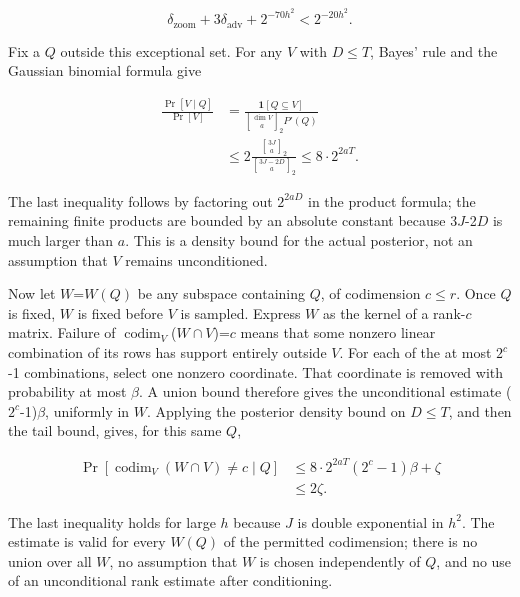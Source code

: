 \begin{equation}\label{eq:10}
\delta_{\mathrm{zoom}}+3\delta_{\mathrm{adv}}+2^{-70h^2}<2^{-20h^2}.
\end{equation}

Fix a \(Q\) outside this exceptional set. For any \(V\) with \(D\)\(\le\)\(T\), Bayes' rule and the Gaussian binomial formula give

\begin{equation}\label{eq:11}
\begin{aligned}\frac{\Pr[V\mid Q]}{\Pr[V]}&=\frac{\mathbf1[Q\subseteq V]}{\genfrac{[}{]}{0pt}{}{\dim V}{a}_2P'(Q)}\\&\le2\frac{\genfrac{[}{]}{0pt}{}{3J}{a}_2}{\genfrac{[}{]}{0pt}{}{3J-2D}{a}_2}\le8\cdot2^{2aT}.\end{aligned}
\end{equation}

The last inequality follows by factoring out \(2^{2aD}\) in the product formula; the remaining finite products are bounded by an absolute constant because 3\(J\)-2\(D\) is much larger than \(a\). This is a density bound for the actual posterior, not an assumption that \(V\) remains unconditioned.

Now let \(W\)=\(W(Q)\) be any subspace containing \(Q\), of codimension \(c\)\(\le\)\(r\). Once \(Q\) is fixed, \(W\) is fixed before \(V\) is sampled. Express \(W\) as the kernel of a rank-\(c\) matrix. Failure of \(\operatorname{codim}_V\)(\(W\cap V\))=\(c\) means that some nonzero linear combination of its rows has support entirely outside \(V\). For each of the at most \(2^c\)-1 combinations, select one nonzero coordinate. That coordinate is removed with probability at most \(\beta\). A union bound therefore gives the unconditional estimate (\(2^c\)-1)\(\beta\), uniformly in \(W\). Applying the posterior density bound on \(D\)\(\le\)\(T\), and then the tail bound, gives, for this same \(Q\),

\begin{equation}\label{eq:12}
\begin{aligned}\Pr[\operatorname{codim}_V(W\cap V)\ne c\mid Q]&\le8\cdot2^{2aT}(2^c-1)\beta+\zeta\\&\le2\zeta.\end{aligned}
\end{equation}

The last inequality holds for large \(h\) because \(J\) is double exponential in \(h^2\). The estimate is valid for every \(W(Q)\) of the permitted codimension; there is no union over all \(W\), no assumption that \(W\) is chosen independently of \(Q\), and no use of an unconditional rank estimate after conditioning.

